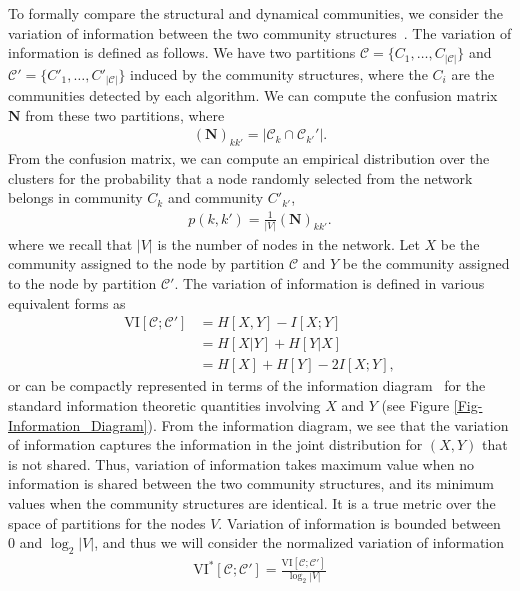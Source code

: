 \documentclass[12pt]{article}
\begin{document}
To formally compare the structural and dynamical communities, we consider the variation of information between the two community structures~\cite{meilua2003comparing}. The variation of information is defined as follows. We have two partitions $\mathcal{C} = \{C_{1}, \ldots, C_{|\mathcal{C}|}\}$ and $\mathcal{C}' = \{C'_{1}, \ldots, C'_{|\mathcal{C}|}\}$ induced by the community structures, where the $C_{i}$ are the communities detected by each algorithm. We can compute the confusion matrix $\mathbf{N}$ from these two partitions, where
\begin{align}
	(\mathbf{N})_{kk'} = |\mathcal{C}_{k} \cap \mathcal{C}_{k'}'|.
\end{align}
From the confusion matrix, we can compute an empirical distribution over the clusters for the probability that a node randomly selected from the network belongs in community $C_{k}$ and community $C'_{k'}$,
\begin{align}
	p(k, k') = \frac{1}{|V|}(\mathbf{N})_{k k'}.
\end{align}
where we recall that $|V|$ is the number of nodes in the network. Let $X$ be the community assigned to the node by partition $\mathcal{C}$ and $Y$ be the community assigned to the node by partition $\mathcal{C}'$. The variation of information is defined in various equivalent forms as
\begin{align}
	\text{VI}[\mathcal{C}; \mathcal{C}'] &= H[X, Y] - I[X; Y] \\
	&= H[X | Y] + H[Y | X] \\
	&= H[X] + H[Y] - 2 I[X; Y],
\end{align}
or can be compactly represented in terms of the information diagram~\cite{yeung1991new} for the standard information theoretic quantities involving $X$ and $Y$ (see Figure \ref{Fig-Information_Diagram}). From the information diagram, we see that the variation of information captures the information in the joint distribution for $(X, Y)$ that is not shared. Thus, variation of information takes maximum value when no information is shared between the two community structures, and its minimum values when the community structures are identical. It is a true metric over the space of partitions for the nodes $V$. Variation of information is bounded between 0 and $\log_{2} |V|$, and thus we will consider the normalized variation of information
\begin{align}
	\text{VI}^{*}[\mathcal{C}; \mathcal{C}'] = \frac{\text{VI}[\mathcal{C}; \mathcal{C}']}{\log_{2}|V|}
\end{align}
\end{document}

